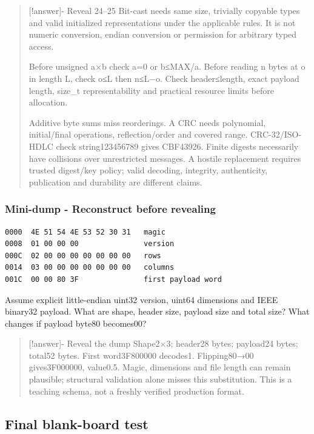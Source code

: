 \begin{quote}
{[}!answer{]}- Reveal 24--25 Bit-cast needs same size, trivially copyable types and valid initialized representations under the applicable rules. It is not numeric conversion, endian conversion or permission for arbitrary typed access.

Before unsigned a×b check a=0 or b≤MAX/a. Before reading n bytes at o in length L, check o≤L then n≤L−o. Check header≤length, exact payload length, size\_t representability and practical resource limits before allocation.

Additive byte sums miss reorderings. A CRC needs polynomial, initial/final operations, reflection/order and covered range. CRC-32/ISO-HDLC check string123456789 gives CBF43926. Finite digests necessarily have collisions over unrestricted messages. A hostile replacement requires trusted digest/key policy; valid decoding, integrity, authenticity, publication and durability are different claims.
\end{quote}

\subsubsection{Mini-dump - Reconstruct before revealing}\label{mini-dump---reconstruct-before-revealing}

\begin{verbatim}
0000  4E 51 54 4E 53 52 30 31   magic
0008  01 00 00 00               version
000C  02 00 00 00 00 00 00 00   rows
0014  03 00 00 00 00 00 00 00   columns
001C  00 00 80 3F               first payload word
\end{verbatim}

Assume explicit little-endian uint32 version, uint64 dimensions and IEEE binary32 payload. What are shape, header size, payload size and total size? What changes if payload byte80 becomes00?

\begin{quote}
{[}!answer{]}- Reveal the dump Shape2×3; header28 bytes; payload24 bytes; total52 bytes. First word3F800000 decodes1. Flipping80→00 gives3F000000, value0.5. Magic, dimensions and file length can remain plausible; structural validation alone misses this substitution. This is a teaching schema, not a freshly verified production format.
\end{quote}

\subsection{Final blank-board test}\label{final-blank-board-test}


